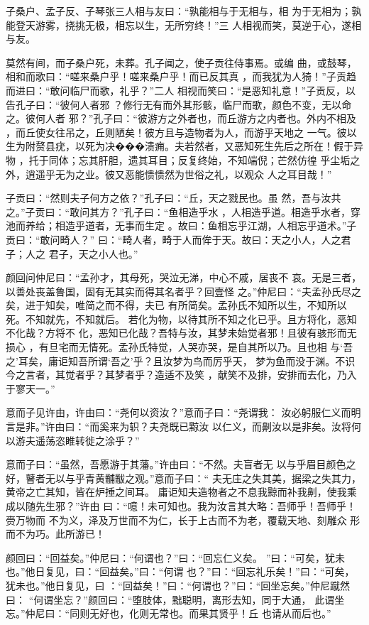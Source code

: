 \documentclass[a4paper,12pt,UTF8,twoside]{ctexbook}
\begin{document}
子桑户、孟子反、子琴张三人相与友曰：“孰能相与于无相与，相 为于无相为；孰能登天游雾，挠挑无极，相忘以生，无所穷终！”三 人相视而笑，莫逆于心，遂相与友。

莫然有间，而子桑户死，未葬。孔子闻之，使子贡往侍事焉。或编 曲，或鼓琴，相和而歌曰：“嗟来桑户乎！嗟来桑户乎！而已反其真 ，而我犹为人猗！”子贡趋而进曰：“敢问临尸而歌，礼乎？”二人 相视而笑曰：“是恶知礼意！”子贡反，以告孔子曰：“彼何人者邪 ？修行无有而外其形骸，临尸而歌，颜色不变，无以命之。彼何人者 邪？”孔子曰：“彼游方之外者也，而丘游方之内者也。外内不相及 ，而丘使女往吊之，丘则陋矣！彼方且与造物者为人，而游乎天地之 一气。彼以生为附赘县疣，以死为决���溃痈。夫若然者，又恶知死生先后之所在！假于异物 ，托于同体；忘其肝胆，遗其耳目；反复终始，不知端倪；芒然仿徨 乎尘垢之外，逍遥乎无为之业。彼又恶能愦愦然为世俗之礼，以观众 人之耳目哉！”

子贡曰：“然则夫子何方之依？”孔子曰：“丘，天之戮民也。虽 然，吾与汝共之。”子贡曰：“敢问其方？”孔子曰：“鱼相造乎水 ，人相造乎道。相造乎水者，穿池而养给；相造乎道者，无事而生定 。故曰：鱼相忘乎江湖，人相忘乎道术。”子贡曰：“敢问畸人？” 曰：“畸人者，畸于人而侔于天。故曰：天之小人，人之君子；人之 君子，天之小人也。”

颜回问仲尼曰：“孟孙才，其母死，哭泣无涕，中心不戚，居丧不 哀。无是三者，以善处丧盖鲁国，固有无其实而得其名者乎？回壹怪 之。”仲尼曰：“夫孟孙氏尽之矣，进于知矣，唯简之而不得，夫已 有所简矣。孟孙氏不知所以生，不知所以死。不知就先，不知就后。 若化为物，以待其所不知之化已乎。且方将化，恶知不化哉？方将不 化，恶知已化哉？吾特与汝，其梦未始觉者邪！且彼有骇形而无损心 ，有旦宅而无情死。孟孙氏特觉，人哭亦哭，是自其所以乃。且也相 与‘吾之’耳矣，庸讵知吾所谓‘吾之’乎？且汝梦为鸟而厉乎天， 梦为鱼而没于渊。不识今之言者，其觉者乎？其梦者乎？造适不及笑 ，献笑不及排，安排而去化，乃入于寥天一。”

意而子见许由，许由曰：“尧何以资汝？”意而子曰：“尧谓我： 汝必躬服仁义而明言是非。”许由曰：“而奚来为轵？夫尧既已黥汝 以仁义，而劓汝以是非矣。汝将何以游夫遥荡恣睢转徙之涂乎？”

意而子曰：“虽然，吾愿游于其藩。”许由曰：“不然。夫盲者无 以与乎眉目颜色之好，瞽者无以与乎青黄黼黻之观。”意而子曰：“ 夫无庄之失其美，据梁之失其力，黄帝之亡其知，皆在炉捶之间耳。 庸讵知夫造物者之不息我黥而补我劓，使我乘成以随先生邪？”许由 曰：“噫！未可知也。我为汝言其大略：吾师乎！吾师乎！赍万物而 不为义，泽及万世而不为仁，长于上古而不为老，覆载天地、刻雕众 形而不为巧。此所游已！

颜回曰：“回益矣。”仲尼曰：“何谓也？”曰：“回忘仁义矣。 ”曰：“可矣，犹未也。”他日复见，曰：“回益矣。”曰：“何谓 也？”曰：“回忘礼乐矣！”曰：“可矣，犹未也。”他日复见，曰 ：“回益矣！”曰：“何谓也？”曰：“回坐忘矣。”仲尼蹴然曰： “何谓坐忘？”颜回曰：“堕肢体，黜聪明，离形去知，同于大通， 此谓坐忘。”仲尼曰：“同则无好也，化则无常也。而果其贤乎！丘 也请从而后也。”
\end{document}
